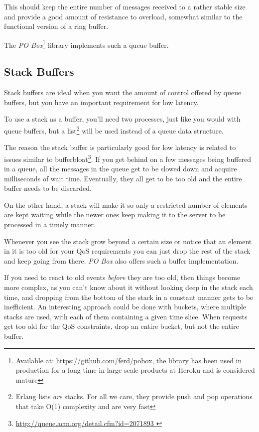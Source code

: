 \documentclass[11pt, oneside]{book}   	%
\begin{document}
This should keep the entire number of messages received to a rather stable size and provide a good amount of resistance to overload, somewhat similar to the functional version of a ring buffer.

The \emph{PO Box}\footnote{Available at: \href{https://github.com/ferd/pobox}{https://github.com/ferd/pobox}, the library has been used in production for a long time in large scale products at Heroku and is considered mature} library implements such a queue buffer.

\subsection{Stack Buffers}

Stack buffers are ideal when you want the amount of control offered by queue buffers, but you have an important requirement for low latency.

To use a stack as a buffer, you'll need two processes, just like you would with queue buffers, but a list\footnote{Erlang lists \emph{are} stacks. For all we care, they provide push and pop operations that take O(1) complexity and are very fast} will be used instead of a queue data structure.

The reason the stack buffer is particularly good for low latency is related to issues similar to bufferbloat\footnote{\href{http://queue.acm.org/detail.cfm?id=2071893}{http://queue.acm.org/detail.cfm?id=2071893 }}. If you get behind on a few messages being buffered in a queue, all the messages in the queue get to be slowed down and acquire milliseconds of wait time. Eventually, they all get to be too old and the entire buffer needs to be discarded.


On the other hand, a stack will make it so only a restricted number of elements are kept waiting while the newer ones keep making it to the server to be processed in a timely manner.


Whenever you see the stack grow beyond a certain size or notice that an element in it is too old for your QoS requirements you can just drop the rest of the stack and keep going from there. \emph{PO Box} also offers such a buffer implementation.

If you need to react to old events \emph{before} they are too old, then things become more complex, as you can't know about it without looking deep in the stack each time, and dropping from the bottom of the stack in a constant manner gets to be inefficient. An interesting approach could be done with buckets, where multiple stacks are used, with each of them containing a given time slice. When requests get too old for the QoS constraints, drop an entire bucket, but not the entire buffer.
\end{document}
